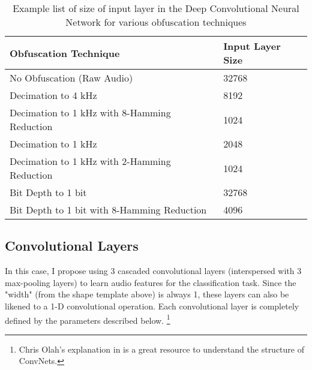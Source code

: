 \begin{table}[!th]
\centering
\begin{tabularx}{\textwidth}{l | l}
\textbf{Obfuscation Technique} & \textbf{Input Layer Size} \\
\hline
No Obfuscation (Raw Audio) & 32768 \\
Decimation to 4 kHz & 8192 \\
Decimation to 1 kHz with 8-Hamming Reduction & 1024 \\
Decimation to 1 kHz & 2048 \\
Decimation to 1 kHz with 2-Hamming Reduction & 1024 \\
Bit Depth to 1 bit & 32768 \\
Bit Depth to 1 bit with 8-Hamming Reduction & 4096 \\
\end{tabularx}
\caption{Example list of size of input layer in the Deep Convolutional Neural Network for various obfuscation techniques}
\label{tab:input_layer_samples}
\end{table}

\subsection{Convolutional Layers}

In this case, I propose using 3 cascaded convolutional layers (interspersed with 3 max-pooling layers) to learn audio features for the classification task.
 Since the "width" (from the shape template above) is always 1, these layers can also be likened to a 1-D convolutional operation.
 Each convolutional layer is completely defined by the parameters described below. \footnote{Chris Olah's explanation in \cite{cnn_modular} is a great resource to understand the structure of ConvNets.}

